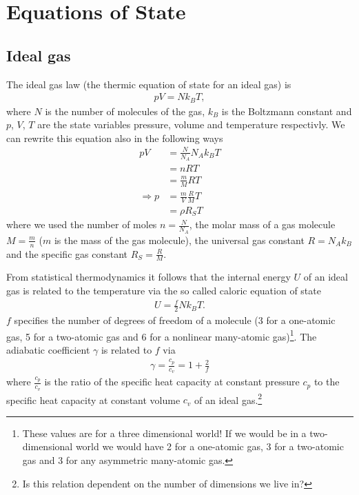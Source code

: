\documentclass[a4paper,
					12pt,
					twoside,
					pagesize,
					cleardoubleplain,
					headsepline,
					bibtotoc
					]{scrbook}
\begin{document}
\newpage
\appendix
\chapter{Equations of State} \label{eos}
\section{Ideal gas}
The ideal gas law (the thermic equation of state for an ideal gas)
is
\begin{align}
p V = N k_B T, \label{eq:igl}
\end{align}
where $N$ is the number of molecules of the gas, $k_B$ is the Boltzmann
constant and $p$, $V$, $T$ are the state variables pressure, volume and
temperature respectivly. We can rewrite this equation also in the following 
ways
\begin{align*}
p V &= \frac{N}{N_A} N_A k_B  T \\ 
	 &= n R T \\
    &= \frac{m}{M} R T \\
\Rightarrow p &= \frac{m}{V} \frac{R}{M} T \\
              &= \rho R_S T
\end{align*}
where we used the number of moles $n=\frac{N}{N_A}$, 
the molar mass of a gas molecule $M = \frac{m}{n}$ ($m$ is the
mass of the gas molecule), the universal gas constant $R= N_A k_B$ and the
specific gas constant $R_S=\frac{R}{M}$.

From statistical thermodynamics it follows that the
internal energy $U$ of an ideal gas is related to the temperature via the
so called caloric equation of state
\begin{align}
U = \frac{f}{2}N k_B T. \label{eq:caleos}
\end{align}
$f$ specifies the number of degrees of freedom of a molecule (3 for a 
one-atomic gas, 5 for a two-atomic gas and 6 for a nonlinear many-atomic
gas)\footnote{These values are for a three dimensional world! If we would be
in a two-dimensional world we would have 2 for a 
one-atomic gas, 3 for a two-atomic gas and 3 for
any asymmetric many-atomic gas.}.
The adiabatic coefficient $\gamma$ is related to $f$ via
\begin{align}
\gamma = \frac{c_p}{c_v} = 1 + \frac{2}{f} \label{eq:gam}
\end{align}
where $\frac{c_p}{c_v}$ is the ratio of the specific
heat capacity at constant pressure $c_p$ to the specific heat capacity at
constant volume $c_v$ of an ideal gas.\footnote{Is this relation dependent on
the number of dimensions we live in?}
\end{document}
